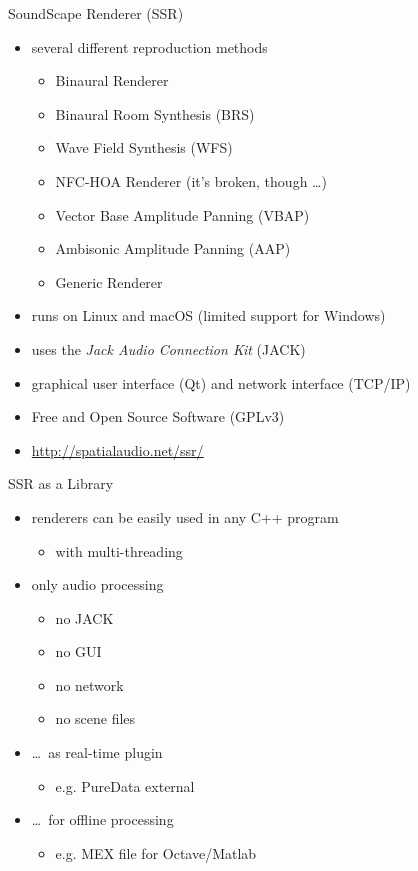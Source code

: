 \documentclass{beamer}
\begin{document}
\begin{frame}{SoundScape Renderer (SSR)}
\begin{itemize}
\item several different reproduction methods
\begin{itemize}
\item Binaural Renderer
\item Binaural Room Synthesis (BRS)
\item Wave Field Synthesis (WFS)
\item NFC-HOA Renderer (it's broken, though \dots)
\item Vector Base Amplitude Panning (VBAP)
\item Ambisonic Amplitude Panning (AAP)
\item Generic Renderer
\end{itemize}
\end{itemize}

\pause

\begin{itemize}
\item runs on Linux and macOS (limited support for Windows)
\item uses the \emph{Jack Audio Connection Kit} (JACK)
\item graphical user interface (Qt) and network interface (TCP/IP)
\item Free and Open Source Software (GPLv3)
\item \url{http://spatialaudio.net/ssr/}
\end{itemize}
\end{frame}

\begin{frame}{SSR as a Library}
\begin{itemize}
\item renderers can be easily used in any C++ program
\begin{itemize}
\item with multi-threading
\end{itemize}
\item only audio processing
\begin{itemize}
\item no JACK
\item no GUI
\item no network
\item no scene files
\end{itemize}
\item \dots\ as real-time plugin
\begin{itemize}
\item e.g. PureData external
\end{itemize}
\item \dots\ for offline processing
\begin{itemize}
\item e.g. MEX file for Octave/Matlab
\end{itemize}
\end{itemize}
\end{frame}
\end{document}
